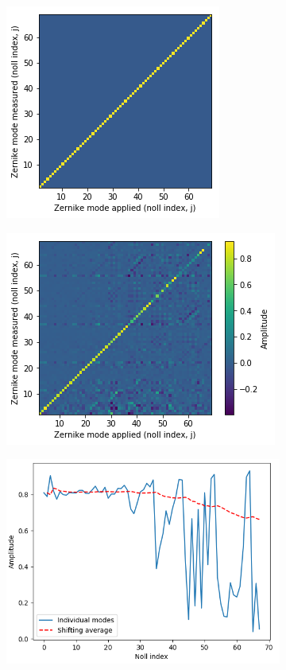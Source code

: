 \begin{figure}[h]
	\centering
	\begin{subfigure}{0.25\textwidth}
		\includegraphics{./images/characterisation_assay_ideal.png}
		\caption{}
		\label{fig:characterisation_assay_ideal}
	\end{subfigure}
	\begin{subfigure}{0.25\textwidth}
		\includegraphics{./images/characterisation_assay_real.png}
		\caption{}
		\label{fig:characterisation_assay_real}
	\end{subfigure}
	\begin{subfigure}{0.4\textwidth}
		\includegraphics{./images/characterisation_assay_real_diag_and_avg.png}

\end{subfigure}
\end{figure}
